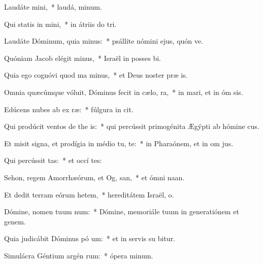 \item Laudáte  mini,~* laudá,  minum.
\item Qui statis in  mini,~* in átriis do  tri.
\item Laudáte Dóminum, quia  minus:~* psállite nómini ejus, quón ve.
\item Quóniam Jacob elégit  minus,~* Israël in posses bi.
\item Quia ego cognóvi quod ma  minus,~* et Deus noster præ  is.
\item Omnia quæcúmque vóluit, Dóminus fecit in cælo,   ra,~* in mari, et in óm sis.
\item Edúcens nubes ab ex ræ:~* fúlgura in  cit.
\item Qui prodúcit ventos de the is:~* qui percússit primogénita Ægýpti ab hómine   cus.
\item Et misit signa, et prodígia in médio tu, te:~* in Pharaónem, et in om  jus.
\item Qui percússit  tas:~* et occí  tes:
\item Sehon, regem Amorrhæórum, et Og,  san,~* et ómni  naan.
\item Et dedit terram eórum hetem,~* hereditátem Israël,  o.
\item Dómine, nomen tuum  num:~* Dómine, memoriále tuum in generatiónem et genem.
\item Quia judicábit Dóminus pó um:~* et in servis su bitur.
\item Simulácra Géntium argén  rum:~* ópera  minum.
